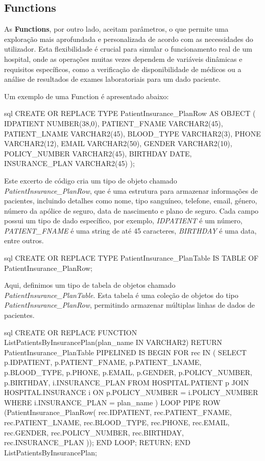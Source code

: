 \subsection{Functions}

As \textbf{Functions}, por outro lado, aceitam parâmetros, o que permite uma exploração mais aprofundada e personalizada de acordo com as necessidades do utilizador. Esta flexibilidade é crucial para simular o funcionamento real de um hospital, onde as operações muitas vezes dependem de variáveis dinâmicas e requisitos específicos, como a verificação de disponibilidade de médicos ou a análise de resultados de exames laboratoriais para um dado paciente.

Um exemplo de uma Function é apresentado abaixo:

\begin{myminted}{sql}
CREATE OR REPLACE TYPE PatientInsurance_PlanRow AS OBJECT (
  IDPATIENT NUMBER(38,0),
  PATIENT_FNAME VARCHAR2(45),
  PATIENT_LNAME VARCHAR2(45),
  BLOOD_TYPE VARCHAR2(3),
  PHONE VARCHAR2(12),
  EMAIL VARCHAR2(50),
  GENDER VARCHAR2(10),
  POLICY_NUMBER VARCHAR2(45),
  BIRTHDAY DATE,
  INSURANCE_PLAN VARCHAR2(45)
);
\end{myminted}

Este excerto de código cria um tipo de objeto chamado \textit{PatientInsurance\_PlanRow}, que é uma estrutura para armazenar informações de pacientes, incluindo detalhes como nome, tipo sanguíneo, telefone, email, género, número da apólice de seguro, data de nascimento e plano de seguro. Cada campo possui um tipo de dado específico, por exemplo, \textit{IDPATIENT} é um número, \textit{PATIENT\_FNAME} é uma string de até 45 caracteres, \textit{BIRTHDAY} é uma data, entre outros.

\begin{myminted}{sql}
CREATE OR REPLACE TYPE PatientInsurance_PlanTable IS TABLE OF PatientInsurance_PlanRow;
\end{myminted}

Aqui, definimos um tipo de tabela de objetos chamado \textit{PatientInsurance\_PlanTable}. Esta tabela é uma coleção de objetos do tipo \textit{PatientInsurance\_PlanRow}, permitindo armazenar múltiplas linhas de dados de pacientes.

\begin{myminted}{sql}
CREATE OR REPLACE FUNCTION ListPatientsByInsurancePlan(plan_name IN VARCHAR2)
  RETURN PatientInsurance_PlanTable PIPELINED IS
BEGIN
  FOR rec IN (
    SELECT p.IDPATIENT, p.PATIENT_FNAME, p.PATIENT_LNAME, p.BLOOD_TYPE, p.PHONE,
           p.EMAIL, p.GENDER, p.POLICY_NUMBER, p.BIRTHDAY, i.INSURANCE_PLAN
    FROM HOSPITAL.PATIENT p
    JOIN HOSPITAL.INSURANCE i ON p.POLICY_NUMBER = i.POLICY_NUMBER
    WHERE i.INSURANCE_PLAN = plan_name
  ) LOOP
    PIPE ROW (PatientInsurance_PlanRow(
      rec.IDPATIENT, rec.PATIENT_FNAME, rec.PATIENT_LNAME, rec.BLOOD_TYPE, rec.PHONE,
      rec.EMAIL, rec.GENDER, rec.POLICY_NUMBER, rec.BIRTHDAY, rec.INSURANCE_PLAN
    ));
  END LOOP;
  RETURN;
END ListPatientsByInsurancePlan;
\end{myminted}

